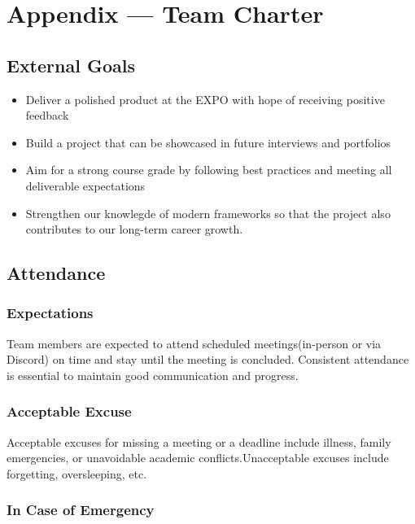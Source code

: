 \documentclass{article}
\begin{document}
\section*{Appendix --- Team Charter}


\subsection*{External Goals}

\begin{itemize}
	\item Deliver a polished product at the EXPO with hope of receiving positive feedback
	\item Build a project that can be showcased in future interviews and portfolios
	\item Aim for a strong course grade by following best practices and meeting all deliverable expectations
	\item Strengthen our knowlegde of modern frameworks so that the project also contributes to our long-term career growth.
\end{itemize}

\subsection*{Attendance}

\subsubsection*{Expectations}

Team members are expected to attend scheduled meetings(in-person or via Discord) on time and stay until the meeting is concluded.  Consistent attendance is essential to maintain good communication and progress.

\subsubsection*{Acceptable Excuse}

Acceptable excuses for missing a meeting or a deadline include illness, family emergencies, or unavoidable academic conflicts.Unacceptable excuses include forgetting, oversleeping, etc.

\subsubsection*{In Case of Emergency}
\end{document}
